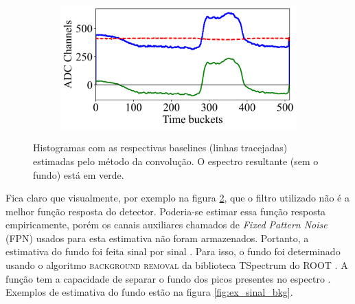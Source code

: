 \documentclass[a4paper,12pt,oneside]{book}
\begin{document}
\begin{figure}[H]
\begin{subfigure}[b]{0.45\textwidth}
        \caption{}
        \label{subfig:bs_fourier_3}
    \end{subfigure}%
    \hfill
    \begin{subfigure}[b]{0.45\textwidth}
        \centering
        \includegraphics[scale=0.42]{figs/bs_fourier_4.png}
        \caption{}
        \label{subfig:bs_fourier_4}
    \end{subfigure}
\caption{Histogramas com as respectivas baselines (linhas tracejadas) estimadas pelo método da convolução. O espectro resultante (sem o fundo) está em verde.}
\label{fig:bs_fourier_exs}
\end{figure}


\par Fica claro que visualmente, por exemplo na figura \ref{subfig:bs_fourier_4}, que o filtro utilizado não é a melhor função resposta do detector. Poderia-se estimar essa função resposta empiricamente, porém os canais auxiliares chamados de \textit{Fixed Pattern Noise} (FPN) \cite{GET} usados para esta estimativa não foram armazenados. Portanto, a estimativa do fundo foi feita sinal por sinal \cite{FORTINO2022166497, GET}. Para isso, o fundo foi determinado usando o algoritmo \textsc{background removal} da biblioteca TSpectrum do ROOT \cite{root}. A função tem a capacidade de separar o fundo dos picos presentes no espectro \cite{BKG_1, BKG_2, BKG_3}. Exemplos de estimativa do fundo estão na figura \ref{fig:ex_sinal_bkg}.

\end{document}
